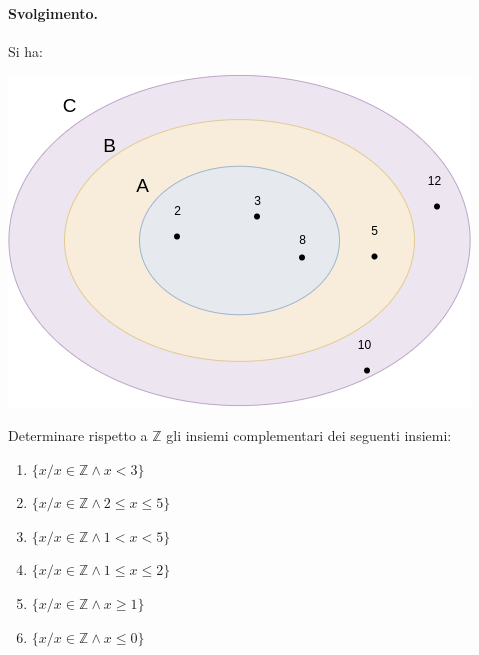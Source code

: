 \paragraph{Svolgimento.} Si ha:
\begin{center}
	\includegraphics[scale=.45]{res/Venn_Esercizio1}
\end{center}
\hfill \blacksquare
\begin{exsbox}
	Determinare rispetto a $\mathbb{Z}$ gli insiemi complementari dei seguenti insiemi:
	\begin{enumerate}
		\item $\{x / x \in \mathbb{Z} \land x <3\}$
		\item $\{x / x \in \mathbb{Z} \land 2 \leq x \leq 5 \}$
		\item $\{x / x \in \mathbb{Z} \land 1 < x < 5 \}$
		\item $\{x / x \in \mathbb{Z} \land 1 \leq x \leq 2 \}$
		\item $\{x / x \in \mathbb{Z} \land x \geq 1 \}$
		\item $\{x / x \in \mathbb{Z} \land x \leq 0 \}$
	\end{enumerate}
\end{exsbox}
